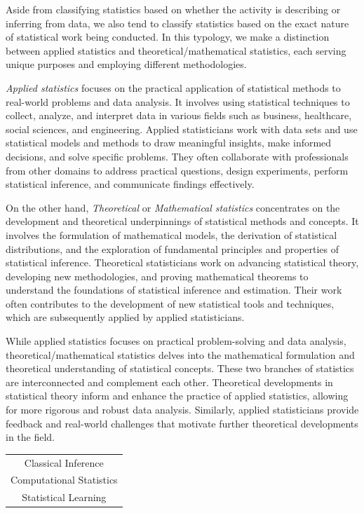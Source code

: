 \documentclass{article}
\begin{document}
Aside from classifying statistics based on whether the activity is describing or inferring from data, we also tend to classify statistics based on the exact nature of statistical work being conducted. In this typology, we make a distinction between applied statistics and theoretical/mathematical statistics, each serving unique purposes and employing different methodologies.

\emph{Applied statistics} focuses on the practical application of statistical methods to real-world problems and data analysis. It involves using statistical techniques to collect, analyze, and interpret data in various fields such as business, healthcare, social sciences, and engineering. Applied statisticians work with data sets and use statistical models and methods to draw meaningful insights, make informed decisions, and solve specific problems. They often collaborate with professionals from other domains to address practical questions, design experiments, perform statistical inference, and communicate findings effectively.

On the other hand, \emph{Theoretical} or \emph{Mathematical statistics} concentrates on the development and theoretical underpinnings of statistical methods and concepts. It involves the formulation of mathematical models, the derivation of statistical distributions, and the exploration of fundamental principles and properties of statistical inference. Theoretical statisticians work on advancing statistical theory, developing new methodologies, and proving mathematical theorems to understand the foundations of statistical inference and estimation. Their work often contributes to the development of new statistical tools and techniques, which are subsequently applied by applied statisticians.

While applied statistics focuses on practical problem-solving and data analysis, theoretical/mathematical statistics delves into the mathematical formulation and theoretical understanding of statistical concepts. These two branches of statistics are interconnected and complement each other. Theoretical developments in statistical theory inform and enhance the practice of applied statistics, allowing for more rigorous and robust data analysis. Similarly, applied statisticians provide feedback and real-world challenges that motivate further theoretical developments in the field.

\begin{margintable}
\begin{tabular}{c} 
    Classical Inference \\
    Computational Statistics \\
    Statistical Learning
\end{tabular}
\end{margintable}
\end{document}
